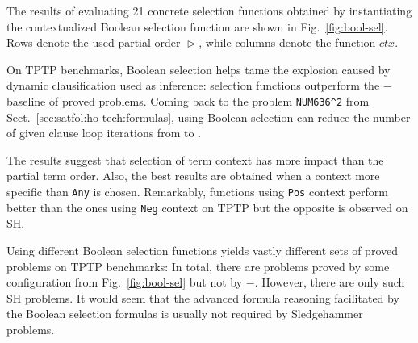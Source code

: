 \documentclass[smallcondensed,draft]{svjour3}     %
\begin{document}
The results of evaluating 21 concrete selection functions obtained
by instantiating the contextualized Boolean selection function are shown in
Fig.~\ref{fig:bool-sel}. Rows denote the used partial order $\vartriangleright$,
while columns denote the function $\mathit{ctx}$.

On TPTP benchmarks, Boolean selection helps tame the explosion caused by
dynamic clausification used as inference:  selection functions
outperform the $-$ baseline of  proved problems. Coming back to the problem
\texttt{NUM636\^{}2} from Sect.~\ref{sec:satfol:ho-tech:formulas}, using Boolean selection
can reduce the number of given clause loop iterations from
 to .

The results suggest that selection of term context has more impact
than the partial term order. %
Also, the best results are obtained when a context more specific than \texttt{Any}
is chosen. Remarkably, functions using \texttt{Pos} context
perform better than the ones using \texttt{Neg} context
on TPTP but the opposite is observed on SH.


Using different Boolean selection functions yields vastly different sets of
proved problems on TPTP benchmarks: In total, there are  problems
proved by some configuration from Fig.~\ref{fig:bool-sel} but not by
$-$. However, there are only  such SH problems.
It would seem that the advanced formula reasoning facilitated by the Boolean
selection formulas is usually not required by Sledgehammer problems.
\end{document}
